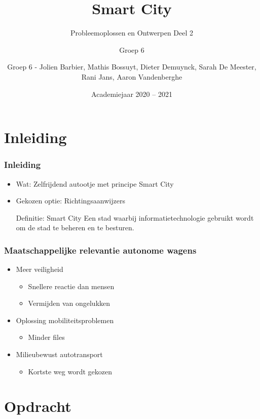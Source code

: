 \documentclass
   [kulak] %
   {kulakbeamer}
\title[Smart City]{Smart City}
\subtitle{\scriptsize Probleemoplossen en Ontwerpen Deel 2}
\author[Groep 6]{Groep 6}%
\institute[Kulak]{KU Leuven Kulak}
\date{Academiejaar 2020 -- 2021}
\author{\scriptsize Groep 6
	\tiny - Jolien Barbier, Mathis Bossuyt, Dieter Demuynck, Sarah De Meester, Rani Jans, Aaron Vandenberghe}
\begin{document}
\begin{titleframe}
\titlepage
\end{titleframe}


\section*{Inleiding}

\begin{frame}
\frametitle{Inleiding}
\begin{itemize}
	
	\item Wat: Zelfrijdend autootje met principe Smart City 
	\item Gekozen optie: Richtingsaanwijzers

	\begin{block}{Definitie: Smart City}
		Een stad waarbij informatietechnologie gebruikt wordt om de stad te beheren en te besturen. \cite{SmartCity}
	\end{block}
\end{itemize}
\end{frame}

\begin{frame}
\frametitle{Maatschappelijke relevantie autonome wagens}
\begin{itemize}
	\item Meer veiligheid
	\begin{itemize}
		\item Snellere reactie dan mensen
		\item Vermijden van ongelukken
	\end{itemize}
	\item Oplossing mobiliteitsproblemen
	\begin{itemize}
		\item Minder files
	\end{itemize}
	\item Milieubewust autotransport
	\begin{itemize}
		\item Kortste weg wordt gekozen
	\end{itemize}

\end{itemize}
\end{frame}


\section[Opdracht]{Opdracht}%
\end{document}

